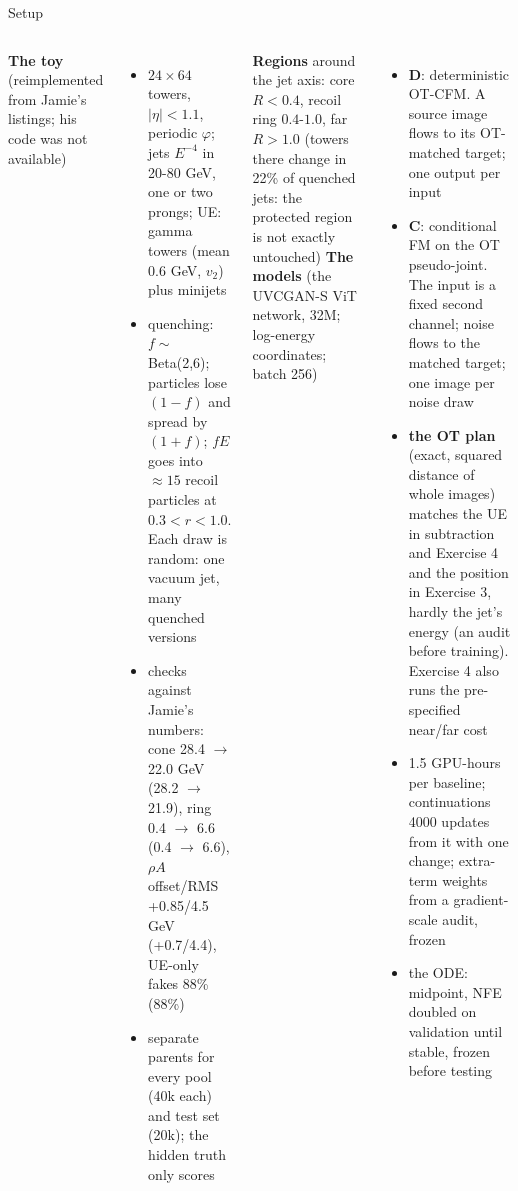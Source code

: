 \documentclass[aspectratio=169,10pt]{beamer}
\begin{document}
\begin{frame}{Setup}
\begin{columns}[T]
\scriptsize
\textbf{The toy} (reimplemented from Jamie's listings; his code was not available)
\begin{itemize}\setlength\itemsep{0.1em}
\item $24 \times 64$ towers, $|\eta| < 1.1$, periodic $\varphi$; jets $E^{-4}$ in 20-80 GeV, one or two
  prongs; UE: gamma towers (mean 0.6 GeV, $v_2$) plus minijets
\item quenching: $f \sim$ Beta(2,6); particles lose $(1-f)$ and spread by $(1+f)$; $fE$ goes into
  $\approx 15$ recoil particles at $0.3 < r < 1.0$. Each draw is random: one vacuum jet, many quenched
  versions
\item checks against Jamie's numbers: cone 28.4 $\to$ 22.0 GeV (28.2 $\to$ 21.9), ring 0.4 $\to$ 6.6
  (0.4 $\to$ 6.6), $\rho A$ offset/RMS +0.85/4.5 GeV (+0.7/4.4), UE-only fakes 88\% (88\%)
\item separate parents for every pool (40k each) and test set (20k); the hidden truth only scores
\end{itemize}
\textbf{Regions} around the jet axis: core $R < 0.4$, recoil ring $0.4$-$1.0$, far $R > 1.0$ (towers
there change in 22\% of quenched jets: the protected region is not exactly untouched)
\scriptsize
\textbf{The models} (the UVCGAN-S ViT network, 32M; log-energy coordinates; batch 256)
\begin{itemize}\setlength\itemsep{0.1em}
\item \textbf{D}: deterministic OT-CFM. A source image flows to its OT-matched target; one output per
  input
\item \textbf{C}: conditional FM on the OT pseudo-joint. The input is a fixed second channel; noise flows
  to the matched target; one image per noise draw
\item \textbf{the OT plan} (exact, squared distance of whole images) matches the UE in subtraction and
  Exercise 4 and the position in Exercise 3, hardly the jet's energy (an audit before training). Exercise 4
  also runs the pre-specified near/far cost
\item 1.5 GPU-hours per baseline; continuations 4000 updates from it with one change; extra-term weights
  from a gradient-scale audit, frozen
\item the ODE: midpoint, NFE doubled on validation until stable, frozen before testing
\end{itemize}
\end{columns}
\end{frame}
\end{document}
